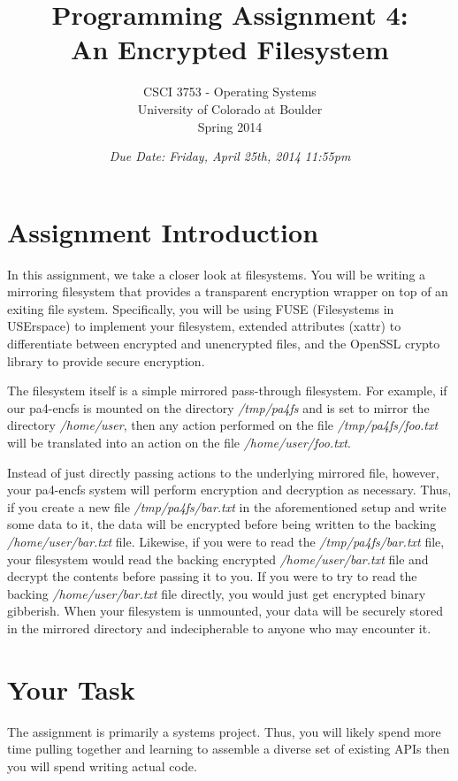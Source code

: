 \documentclass[12pt]{article}
\title{Programming Assignment 4:\\An Encrypted Filesystem}
\author{
  CSCI 3753 - Operating Systems\\
  University of Colorado at Boulder\\
  Spring 2014
}
\date{\emph{Due Date: Friday, April 25th, 2014 11:55pm}}
\begin{document}
\maketitle

\section{Assignment Introduction}
In this assignment, we take a closer look at filesystems.
You will be writing a mirroring filesystem that provides a
transparent encryption wrapper on top of an exiting file system.
Specifically, you will be using FUSE\cite{fuse-website}
(Filesystems in USErspace) to implement your filesystem,
extended attributes (xattr) to differentiate between encrypted and
unencrypted files, and the OpenSSL\cite{openssl-website}
crypto\cite{openssl-evp} library to provide secure encryption.

The filesystem itself is a simple mirrored pass-through filesystem. For
example, if our pa4-encfs is mounted on the directory \textit{/tmp/pa4fs}
and is set to mirror the directory \textit{/home/user}, then any
action performed on the file \textit{/tmp/pa4fs/foo.txt}
will be translated into an action on the file
\textit{/home/user/foo.txt}.

Instead of just directly passing actions to the
underlying mirrored file, however, your pa4-encfs system will perform encryption
and decryption as necessary. Thus, if you create a new file
\textit{/tmp/pa4fs/bar.txt} in the aforementioned setup
and write some data to it, the data will
be encrypted before being written to the backing
\textit{/home/user/bar.txt} file. Likewise, if you were to read the
\textit{/tmp/pa4fs/bar.txt} file, your filesystem would read the backing encrypted
\textit{/home/user/bar.txt} file and decrypt the contents before
passing it to you. If you were to try to read
the backing \textit{/home/user/bar.txt} file directly, you would just
get encrypted binary gibberish. When your filesystem is unmounted,
your data will be securely stored in the mirrored directory
and indecipherable to anyone who may encounter it.

\section{Your Task}

The assignment is primarily a systems project. Thus, you will likely spend
more time pulling together and learning to assemble a diverse set of
existing APIs then you will spend writing actual code.
\end{document}
